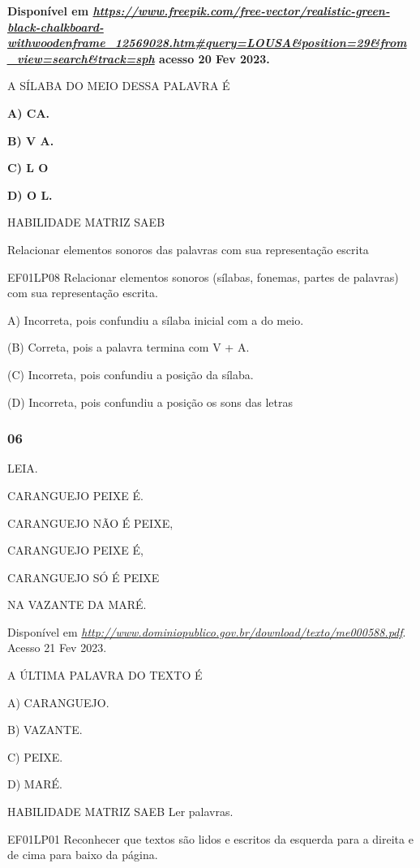 \begin{escola}
\textbf{Disponível em
\href{https://www.freepik.com/free-vector/realistic-green-black-chalkboard-withwoodenframe_12569028.htm\#query=LOUSA\&position=29\&from_view=search\&track=sph}{\emph{https://www.freepik.com/free-vector/realistic-green-black-chalkboard-withwoodenframe\_12569028.htm\#query=LOUSA\&position=29\&from\_view=search\&track=sph}}
acesso 20 Fev 2023.}

A SÍLABA DO MEIO DESSA PALAVRA É

\textbf{A) CA.}

\textbf{B) V A.}

\textbf{C) L O}

\textbf{D) O L.}

HABILIDADE MATRIZ SAEB

Relacionar elementos sonoros das palavras com sua representação escrita

EF01LP08 Relacionar elementos sonoros (sílabas, fonemas, partes de
palavras) com sua representação escrita.

A) Incorreta, pois confundiu a sílaba inicial com a do meio.

(B) Correta, pois a palavra termina com V + A.

(C) Incorreta, pois confundiu a posição da sílaba.

(D) Incorreta, pois confundiu a posição os sons das letras

\subsubsection{06}\label{section-62}

LEIA.

CARANGUEJO PEIXE É.

CARANGUEJO NÃO É PEIXE,

CARANGUEJO PEIXE É,

CARANGUEJO SÓ É PEIXE

NA VAZANTE DA MARÉ.

Disponível em
\href{http://www.dominiopublico.gov.br/download/texto/me000588.pdf}{\emph{http://www.dominiopublico.gov.br/download/texto/me000588.pdf}}.
Acesso 21 Fev 2023.

A ÚLTIMA PALAVRA DO TEXTO É

A) CARANGUEJO.

B) VAZANTE.

C) PEIXE.

D) MARÉ.

HABILIDADE MATRIZ SAEB Ler palavras.

EF01LP01 Reconhecer que textos são lidos e escritos da esquerda para a
direita e de cima para baixo da página.


\end{escola}

